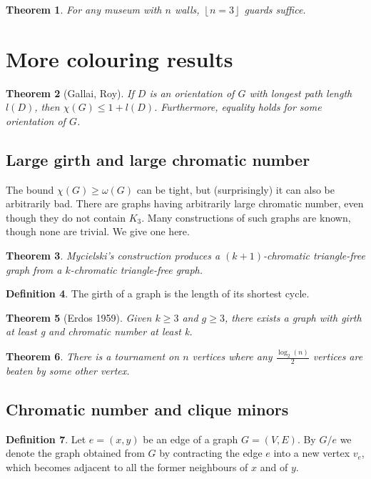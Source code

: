 \documentclass[11pt, fleqn, a4paper, landscape]{article}
\theoremstyle{plain} %
\newtheorem{thm}{Theorem}
\theoremstyle{remark} %
\theoremstyle{definition} %
\newtheorem{defi}[thm]{Definition}
\begin{document}
\begin{multicols}{3}
\begin{thm}
For any museum with $n$ walls, $\left\lfloor n=3\right\rfloor$ guards suffice.
\end{thm}

\section{More colouring results}
\begin{thm}[Gallai, Roy]
If $D$ is an orientation of $G$ with longest path length $l(D)$, then $\chi(G) \le 1 + l(D)$. Furthermore, equality holds for some orientation of $G$.
\end{thm} 

\subsection{Large girth and large chromatic number}

The bound $\chi(G) \ge \omega(G)$ can be tight, but (surprisingly) it can also be arbitrarily bad. There are graphs having arbitrarily large chromatic number, even though they do not contain $K_3$. Many constructions of such graphs are known, though none are trivial. We give one here.
\addtocounter{thm}{1}
\begin{thm}
Mycielski’s construction produces a $(k + 1)$-chromatic triangle-free graph from a $k$-chromatic triangle-free graph.
\end{thm}

\begin{defi}
The girth of a graph is the length of its shortest cycle.
\end{defi}
\begin{thm}[Erdos 1959]
Given $k \ge 3$ and $g \ge 3$, there exists a graph with girth at least g and
chromatic number at least k.
\end{thm} 
\addtocounter{thm}{2}
\begin{thm}
There is a tournament on $n$ vertices where any $\frac{\log_2(n)}{2}$ vertices are beaten by some other vertex.
\end{thm}
\subsection{Chromatic number and clique minors}
\begin{defi}
Let $e = (x, y)$ be an edge of a graph $G = (V,E)$. By $G\slash e$ we denote the graph obtained from $G$ by contracting the edge $e$ into a new vertex $v_e$, which becomes adjacent to all the former neighbours of $x$ and of $y$. 


\end{defi}
\end{multicols}
\end{document}
